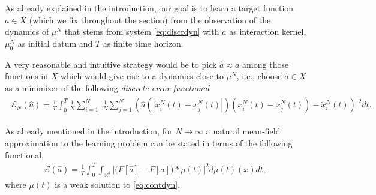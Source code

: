\documentclass[A4paper,11pt]{article}
\theoremstyle{definition}
\newcommand{\R}{\mathbb{R}}
\begin{document}
As already explained in the introduction, our goal is to learn a target function $a \in X$ (which we fix throughout the section) from the observation of the dynamics of $\mu^N$ that stems from system \eqref{eq:discrdyn} with $a$ as interaction kernel, $\mu_0^N$ as initial datum and $T$ as finite time horizon.

A very reasonable and intuitive strategy would be to pick $\widehat a \approx a$ among those functions in $X$ which would give rise to a dynamics close to $\mu^N$, i.e., choose $\widehat a \in X$ as a minimizer of the following \textit{discrete error functional}
\begin{align}\label{eq-def-error}
	\begin{split}
	\mathcal E_N(\widehat a) = \frac{1}{T}\int_0^T\frac{1}{N}\sum_{i=1}^N\biggl|\frac{1}{N}\sum_{j=1}^N
			\left(\widehat a(|x^N_i(t)-x^N_j(t)|)(x^N_i(t) - x^N_j(t))-\dot{x}^N_i(t)\right)\biggr|^2 dt.
	\end{split}
\end{align}


As already mentioned in the introduction, for $N \to \infty$ a natural mean-field approximation to the learning problem can be stated in terms of the following functional,
\begin{align*}
	\mathcal E(\widehat a)=\frac{1}{T}\int_0^T \int_{\R^d} \biggl|\bigl(F[\widehat a]-F[a]\bigr)\ast\mu(t)\biggr|^2d\mu(t)(x)dt,
\end{align*}
where $\mu(t)$ is a weak solution to \eqref{eq:contdyn}. 
\end{document}

